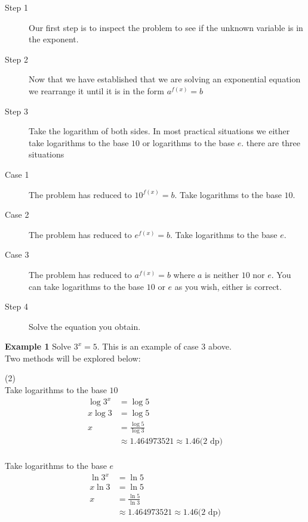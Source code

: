 \begin{description}
	\item [Step 1] Our first step is to inspect the problem to see if the unknown
	variable is in the exponent. 
	
	\item [Step 2] Now that we have
	established that we are solving an exponential equation we rearrange it until it is in the form $a^{f (x)} =b$ 
	
	\item [Step 3] Take the logarithm
	of both sides. In most practical situations we either take logarithms to the base $10$ or logarithms to the base $e$. there are three situations 
	
	\item [Case
	1] The problem has reduced to $10^{f (x)} =b$. Take logarithms to the base $10$. 
	
	\item [Case 2] The problem has
	reduced to $e^{f (x)} =b$. Take logarithms to the base $e$. 
	
	\item [Case 3] The problem has
	reduced to $a^{f (x)} =b$ where $a$ is neither $10$ nor $e$. You can take logarithms to the base $10$ or $e$ as you wish, either is correct. 
	
	\item [Step 4]
	Solve the equation you obtain. \end{description}
\clearpage
\textbf{Example 1} Solve $3^{x} =5$. This is an example of case $3$ above.\medskip\\ 
\solution Two methods will be explored below:
\begin{tasks}[label-width={5em}](2)
\task[Method 1] \\Take logarithms to the base $10$\\
\begin{align*}\log  3^{x} &  = \log  5 \\
x \log  3 &  = \log  5 \\
x &  = \frac{\log  5}{\log  3} \\
&  \approx 1.464973521 \approx 1.46\text{(2 dp)}\end{align*}
\task[Method 2] \\Take logarithms to the base $e$\\
\begin{align*}\ln  3^{x} &  = \ln  5 \\
x \ln  3 &  = \ln  5 \\
x &  = \frac{\ln  5}{\ln  3} \\
&  \approx 1.464973521 \approx 1.46\text{(2 dp)}\end{align*}
\end{tasks}
